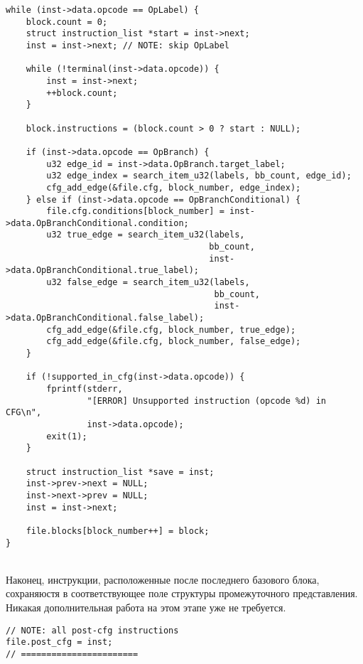 \documentclass[14pt]{extarticle}
\begin{document}
\begin{lstlisting}[caption={составление графа потока управления}]
while (inst->data.opcode == OpLabel) {
    block.count = 0;
    struct instruction_list *start = inst->next;
    inst = inst->next; // NOTE: skip OpLabel
    
    while (!terminal(inst->data.opcode)) {
        inst = inst->next;
        ++block.count;
    }
    
    block.instructions = (block.count > 0 ? start : NULL);
    
    if (inst->data.opcode == OpBranch) {
        u32 edge_id = inst->data.OpBranch.target_label;
        u32 edge_index = search_item_u32(labels, bb_count, edge_id);
        cfg_add_edge(&file.cfg, block_number, edge_index);
    } else if (inst->data.opcode == OpBranchConditional) {
        file.cfg.conditions[block_number] = inst->data.OpBranchConditional.condition;
        u32 true_edge = search_item_u32(labels,
                                        bb_count,
                                        inst->data.OpBranchConditional.true_label);
        u32 false_edge = search_item_u32(labels,
                                         bb_count,
                                         inst->data.OpBranchConditional.false_label);
        cfg_add_edge(&file.cfg, block_number, true_edge);
        cfg_add_edge(&file.cfg, block_number, false_edge);
    }
    
    if (!supported_in_cfg(inst->data.opcode)) {
        fprintf(stderr,
                "[ERROR] Unsupported instruction (opcode %d) in CFG\n",
                inst->data.opcode);
        exit(1);
    }
    
    struct instruction_list *save = inst;
    inst->prev->next = NULL;
    inst->next->prev = NULL;
    inst = inst->next;
    
    file.blocks[block_number++] = block;
}
\end{lstlisting}
~\\ %

Наконец, инструкции, расположенные после последнего базового блока, сохраняюстя в соответствующее поле структуры промежуточного представления. Никакая дополнительная работа на этом этапе уже не требуется.
\begin{lstlisting}[caption={отделение инструкций, расположенных после базовых блоков}]
// NOTE: all post-cfg instructions
file.post_cfg = inst;
// =======================
\end{lstlisting}
~\\ %
\end{document}
